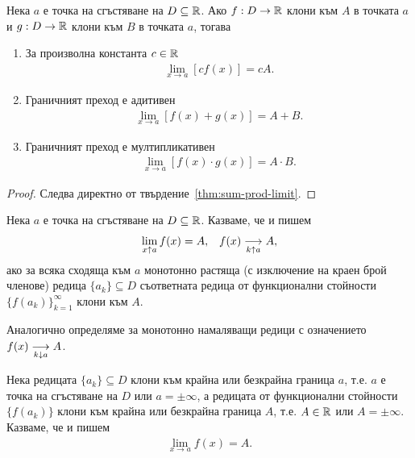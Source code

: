 \documentclass[numbers=endperiod, bibliography=totocnumbered]{scrartcl}
\begin{document}
\begin{proposition}\label{thm:limit-linear-mult}
  Нека \( a \) е точка на сгъстяване на \( D \subseteq \R \). Ако \( f: D \to \R \) клони към \( A \) в точката \( a \) и \( g: D \to \R \) клони към \( B \) в точката \( a \), тогава
  \begin{enumerate}
    \item За произволна константа \( c \in \R \)
    \begin{align*}
      \lim_{x \to a} [c f(x)] = c A.
    \end{align*}

    \item Граничният преход е адитивен
    \begin{align*}
      \lim_{x \to a} [f(x) + g(x)] = A + B.
    \end{align*}

    \item Граничният преход е мултипликативен
    \begin{align*}
      \lim_{x \to a} [f(x) \cdot g(x)] = A \cdot B.
    \end{align*}
  \end{enumerate}
\end{proposition}
\begin{proof}
  Следва директно от твърдение~\ref{thm:sum-prod-limit}.
\end{proof}

\begin{definition}
  Нека \( a \) е точка на сгъстяване на \( D \subseteq \R \). Казваме, че  и пишем
  \begin{align*}
    \lim_{x \uparrow a} f(x) = A,
    &&
    f(x) \Conv[k \uparrow a]{} A,
  \end{align*}
  ако за всяка сходяща към \( a \) монотонно растяща (с изключение на краен брой членове) редица \( \{ a_k \} \subseteq D \) съответната редица от функционални стойности \( {\{ f(a_k) \}}_{k=1}^\infty \) клони към \( A \).

  Аналогично определяме  за монотонно намаляващи редици с означението \( f(x) \Conv[k \downarrow a]{} A \).
\end{definition}

\begin{definition}
  Нека редицата \( \{ a_k \} \subseteq D \) клони към крайна или безкрайна граница \( a \), т.е. \( a \) е точка на сгъстяване на \( D \) или \( a = \pm \infty \), а редицата от функционални стойности \( \{ f(a_k) \} \) клони към крайна или безкрайна граница \( A \), т.е. \( A \in \R \) или \( A = \pm \infty \). Казваме, че  и пишем
  \begin{align*}
    \lim_{x \to a} f(x) = A.
  \end{align*}
\end{definition}
\end{document}
